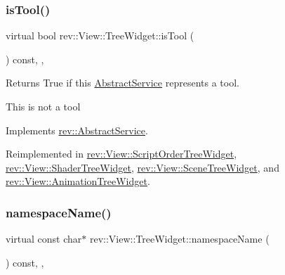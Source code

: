\subsubsection{\texorpdfstring{isTool()}{isTool()}}
{\footnotesize\ttfamily virtual bool rev\+::\+View\+::\+Tree\+Widget\+::is\+Tool (\begin{DoxyParamCaption}{ }\end{DoxyParamCaption}) const\hspace{0.3cm}{\ttfamily [inline]}, {\ttfamily [override]}, {\ttfamily [virtual]}}



Returns True if this \mbox{\hyperlink{classrev_1_1_abstract_service}{Abstract\+Service}} represents a tool. 

This is not a tool 

Implements \mbox{\hyperlink{classrev_1_1_abstract_service_aeb245a6d33601ccb842f4c7c2a3dda7a}{rev\+::\+Abstract\+Service}}.



Reimplemented in \mbox{\hyperlink{classrev_1_1_view_1_1_script_order_tree_widget_af9f5bd25d83e76ee06855074cbd1c265}{rev\+::\+View\+::\+Script\+Order\+Tree\+Widget}}, \mbox{\hyperlink{classrev_1_1_view_1_1_shader_tree_widget_a18ff9900b7ddc8a7728443b42020be72}{rev\+::\+View\+::\+Shader\+Tree\+Widget}}, \mbox{\hyperlink{classrev_1_1_view_1_1_scene_tree_widget_a291ef1fb24cd270729d826099c730366}{rev\+::\+View\+::\+Scene\+Tree\+Widget}}, and \mbox{\hyperlink{classrev_1_1_view_1_1_animation_tree_widget_a5608e3ec9dd33d9b9f3ae0da8bf41bea}{rev\+::\+View\+::\+Animation\+Tree\+Widget}}.

\mbox{\label{classrev_1_1_view_1_1_tree_widget_a09be824e34e50e9622c3dc333c9a3c07}} 
\subsubsection{\texorpdfstring{namespaceName()}{namespaceName()}}
{\footnotesize\ttfamily virtual const char$\ast$ rev\+::\+View\+::\+Tree\+Widget\+::namespace\+Name (\begin{DoxyParamCaption}{ }\end{DoxyParamCaption}) const\hspace{0.3cm}{\ttfamily [inline]}, {\ttfamily [override]}, {\ttfamily [virtual]}}



